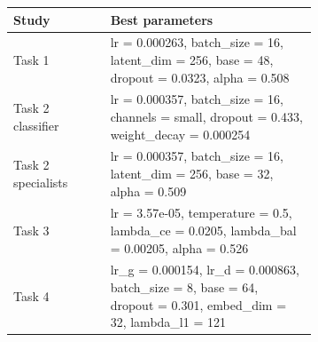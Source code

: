 \begin{tabular}{lp{0.68\linewidth}}
\toprule
Study & Best parameters \\
\midrule
Task 1 & lr = 0.000263, batch\_size = 16, latent\_dim = 256, base = 48, dropout = 0.0323, alpha = 0.508 \\
Task 2 classifier & lr = 0.000357, batch\_size = 16, channels = small, dropout = 0.433, weight\_decay = 0.000254 \\
Task 2 specialists & lr = 0.000357, batch\_size = 16, latent\_dim = 256, base = 32, alpha = 0.509 \\
Task 3 & lr = 3.57e-05, temperature = 0.5, lambda\_ce = 0.0205, lambda\_bal = 0.00205, alpha = 0.526 \\
Task 4 & lr\_g = 0.000154, lr\_d = 0.000863, batch\_size = 8, base = 64, dropout = 0.301, embed\_dim = 32, lambda\_l1 = 121 \\
\bottomrule
\end{tabular}
